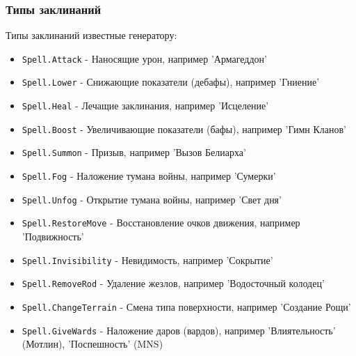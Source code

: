 \subsubsection{Типы заклинаний}
\label{spellTypes}
Типы заклинаний известные генератору:
\begin{itemize}
\item \texttt{Spell.Attack} - Наносящие урон, например 'Армагеддон'
\item \texttt{Spell.Lower} - Снижающие показатели (дебафы), например 'Гниение'
\item \texttt{Spell.Heal} - Лечащие заклинания, например 'Исцеление'
\item \texttt{Spell.Boost} - Увеличивающие показатели (бафы), например 'Гимн Кланов'
\item \texttt{Spell.Summon} - Призыв, например 'Вызов Белиарха'
\item \texttt{Spell.Fog} - Наложение тумана войны, например 'Сумерки'
\item \texttt{Spell.Unfog} - Открытие тумана войны, например 'Свет дня'
\item \texttt{Spell.RestoreMove} - Восстановление очков движения, например 'Подвижность'
\item \texttt{Spell.Invisibility} - Невидимость, например 'Сокрытие'
\item \texttt{Spell.RemoveRod} - Удаление жезлов, например 'Водосточный колодец'
\item \texttt{Spell.ChangeTerrain} - Смена типа поверхности, например 'Создание Рощи'
\item \texttt{Spell.GiveWards} - Наложение даров (вардов), например 'Влиятельность' (Мотлин), 'Поспешность' (MNS)
\end{itemize}